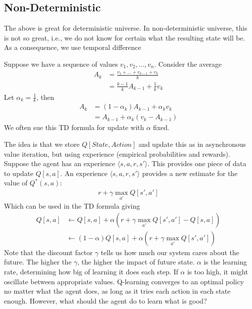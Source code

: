 \documentclass[a4paper]{article}
\theoremstyle{plain}
\theoremstyle{definition}
\newtheorem{defn}{Definition}[section]
\theoremstyle{remark}
\begin{document}
 \subsection{Non-Deterministic}
 The above is great for deterministic universe. In non-deterministic universe, this is not so great, i.e., we do not know for certain what the resulting state will be. As a consequence, we use temporal difference
 \begin{tcolorbox}[colback=black!3!white,colframe=black!60!white,title=\begin{defn}Temporal Difference \label{Temporal Difference}\end{defn}]
 Suppose we have a sequence of values $v_1,v_2,\ldots,v_n$. Consider the average
 \begin{align*}
	 A_k &= \frac{v_1+\ldots+v_{k-1}+v_{k}}{k}\\
	     &= \frac{k-1}{k}A_{k-1}+\frac{1}{k}v_k
 \end{align*}
 Let $\alpha_k = \frac{1}{k}$, then
 \begin{align*}
	 A_k &= (1-\alpha_k)A_{k-1} + \alpha_k v_k \\
	     &= A_{k-1} + \alpha_k(v_k-A_{k-1})
 \end{align*}
 We often sue this TD formula for update with $\alpha$ fixed.
 \end{tcolorbox}
 The idea is that we store $Q[State,Action]$ and update this as in asynchronous value iteration, but using experience (empirical probabilities and rewards). Suppose the agent has an experience $\langle s,a,r,s' \rangle$. This provides one piece of data to update $Q[s,a]$. An experience $\langle s,a,r,s' \rangle$ provides a new estimate for the value of $Q^{*}(s,a)$:
 \begin{align*}
 	r+\gamma \max_{a'}Q[s',a']
 \end{align*}
 Which can be used in the TD formula giving
 \begin{align*}
	 Q[s,a]& \leftarrow Q[s,a] + \alpha(r + \gamma \max_{a'} Q[s',a'] - Q[s,a]) \\
	       & \leftarrow (1-\alpha)Q[s,a] + \alpha(r+\gamma \max_{a'}Q[s',a'])
 \end{align*}
 Note that the discount factor $\gamma$ tells us how much our system cares about the future. The higher the $\gamma$, the higher the impact of future state. $\alpha$ is the learning rate, determining how big of learning it does each step. If $\alpha$ is too high, it might oscillate between appropriate values. Q-learning converges to an optimal policy no matter what the agent does, as long as it tries each action in each state enough. However, what should the agent do to learn what is good?
\end{document}

